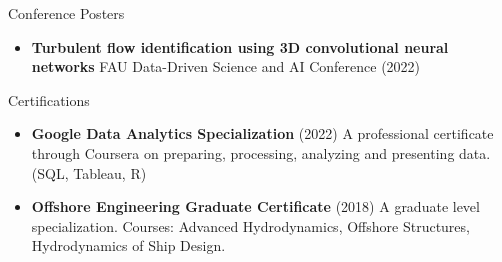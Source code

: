 \documentclass[]{mcdowellcv}
\begin{document}
		\begin{cvsubsection}{Conference Posters}{}{}
			\begin{itemize}
				\item  \textbf{Turbulent flow identification using 3D convolutional neural networks} FAU Data-Driven Science and AI Conference (2022)
			\end{itemize}
		\end{cvsubsection}
	
	\begin{cvsection}{Certifications}
		\begin{cvsubsection}{}{}{}	
			\begin{itemize}
				\item \textbf{Google Data Analytics Specialization} (2022) A professional certificate through Coursera on preparing, processing, analyzing and presenting data. (SQL, Tableau, R)
				\item \textbf{Offshore Engineering Graduate Certificate} (2018) A graduate level specialization. Courses: Advanced Hydrodynamics, Offshore Structures, Hydrodynamics of Ship Design.
			\end{itemize}
		\end{cvsubsection}
	\end{cvsection}
	
	
\end{document}
